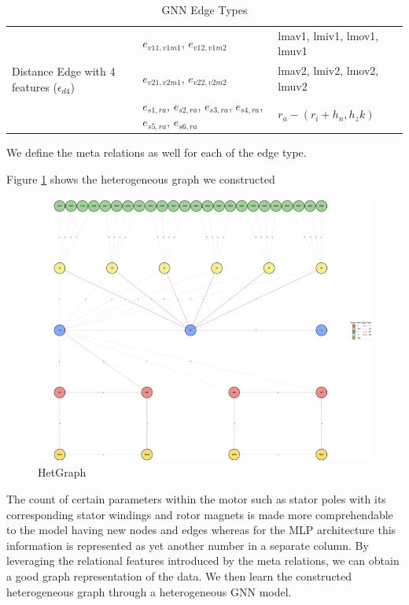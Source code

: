 \documentclass{report} %
\begin{document}
\begin{enumerate}
\begin{table}[H]
\begin{tabular}{|p{}|p{}|p{}|}
        \hline
        \multirow{3}{0.2\textwidth}{Distance Edge with 4 features (\( \epsilon_{d4} \))} & \( e_{v11, v1m1} \), \( e_{v12, v1m2} \) & lmav1, lmiv1, lmov1, lmuv1 \\
                                            &  \( e_{v21, v2m1} \), \( e_{v22, v2m2} \) & lmav2, lmiv2, lmov2, lmuv2 \\
                                            &  \( e_{s1, ra} \), \( e_{s2, ra} \), \( e_{s3, ra} \), \( e_{s4, ra} \), \( e_{s5, ra} \), \( e_{s6, ra} \)   &  \(r_a - (r_i + h_n, h_zk) \)\\

        \hline
        \end{tabular}
        \caption{\ac{GNN} Edge Types}
        \label{tab:GNN Edge Types}
    \end{table}

    We define the meta relations as well for each of the edge type.

\end{enumerate}

Figure \ref{fig:HetGraph} shows the heterogeneous graph we constructed
\begin{figure}[H]
    \centering
    \includegraphics[width=1\textwidth]{./ReportImages/graph.png} 
    \caption{HetGraph}
    \label{fig:HetGraph}
\end{figure}
The count of certain parameters within the motor such as stator poles with its corresponding stator windings and rotor magnets is made more comprehendable to the 
model having new nodes and edges whereas for the \ac{MLP} architecture this information is represented as yet another number in a separate column. 
By leveraging the relational features introduced by the meta relations, we can obtain a good graph representation of the data.
We then learn the constructed heterogeneous graph through a heterogeneous \ac{GNN} model.  
\end{document}
